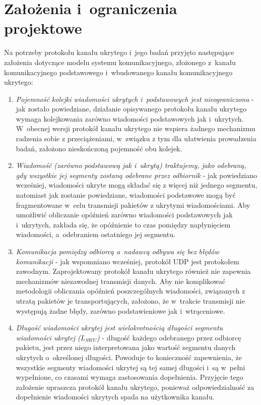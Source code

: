 \documentclass[a4paper, twoside, openright, 12pt]{report}
\begin{document}
    \section{Założenia i~ograniczenia projektowe}
    Na potrzeby protokołu kanału ukrytego i~jego badań przyjęto następujące założenia
    dotyczące modelu systemu komunikacyjnego, złożonego z~kanału komunikacyjnego
    podstawowego i~wbudowanego kanału komunikacyjnego ukrytego:
    \begin{enumerate}
        \item \emph{Pojemność kolejki wiadomości ukrytych i~podstawowych jest nieograniczona} -
            jak zostało powiedziane, działanie opisywanego protokołu
            kanału ukrytego wymaga kolejkowania zarówno wiadomości podstawowych
            jak i~ukrytych. W~obecnej wersji protokół kanału ukrytego nie wspiera
            żadnego mechanizmu radzenia sobie z przeciążeniami, w~związku z tym
            dla ułatwienia prowadzenia badań, założono nieskończoną pojemność obu kolejek.

        \item \emph{Wiadomość (zarówno podstawową jak i~ukrytą) traktujemy, jako odebraną,
            gdy wszystkie jej segmenty zostaną odebrane przez odbiornik} - jak powiedziano
            wcześniej, wiadomości ukryte mogą składać się z więcej niż jednego segmentu,
            natomiast jak zostanie powiedziane, wiadomości podstawowe mogą być fragmentowane
            w~celu transmisji pakietów z ukrytymi wiadomościami. Aby umożliwić
            obliczanie opóźnień zarówno wiadomości podstawowych jak i~ukrytych,
            zakłada się, że opóźnienie to czas pomiędzy napłynięciem wiadomości,
            a~odebraniem ostatniego jej segmentu.

        \item \emph{Komunikacja pomiędzy odbiorcą a~nadawcą odbywa się bez błędów komunikacji} -
            jak wspomniano wcześniej, protokół UDP jest protokołem zawodnym.
            Zaprojektowany protokół kanału ukrytego również nie zapewnia mechanizmów niezawodnej
            transmisji danych. Aby nie komplikować metodologii
            obliczania opóźnień poszczególnych wiadomości, związanych z utratą
            pakietów je transportujących, założono, że w~trakcie transmisji nie
            występują żadne błędy, zarówno podstawieniowe jak i~wtrąceniowe.

        \item \emph{Długość wiadomości ukrytej jest wielokrotnością długości segmentu
            wiadomości ukrytej (\(L_{SWU}\))} - długość każdego odebranego przez odbiorcę pakietu,
            jest przez niego interpretowana jako wartość segmentu danych ukrytych o~określonej
            długości. Powoduje to konieczność zapewnienia, że wszystkie segmenty
            wiadomości ukrytej są tej samej długości i~są w~pełni wypełnione, co czasami
            wymaga zastosowania dopełnienia. Przyjęcie tego założenie upraszcza protokół
            kanału ukrytego, ponieważ odpowiedzialność za dopełnienie wiadomości ukrytych
            spada na użytkownika kanału.
    \end{enumerate}
\end{document}
